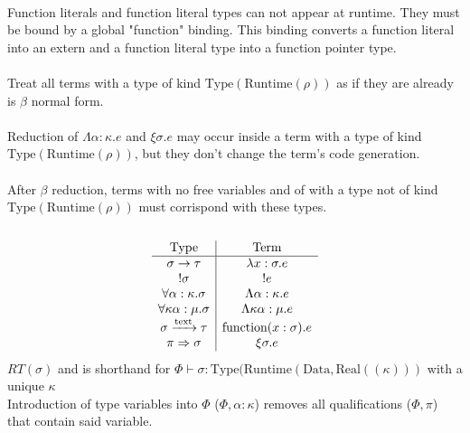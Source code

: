 \documentclass {article}
\begin{document}
\\
Function literals and function literal types can not appear at runtime. They must be bound by a global "function" binding.
This binding converts a function literal into an extern and a function literal type into a function pointer type. \\
\\
Treat all terms with a type of kind $ \text{Type} (\text{Runtime} (\rho)) $ as if they are already is $ \beta $ normal form. \\
\\
Reduction of $ \Lambda \alpha : \kappa. e $ and $ \xi \sigma. e $ may occur inside a term with a type of kind $ \text{Type} (\text{Runtime} (\rho)) $, but they don't
change the term's code generation. \\
\\
After $ \beta $ reduction, terms with no free variables and of with a type not of kind $ \text{Type} (\text{Runtime} (\rho) ) $ must corrispond with these types. \\
\\
\begin{gather*}
\begin{array}{c | c}
\text{Type} & \text{Term} \\
\hline
\sigma \to \tau & \lambda x : \sigma. e \\
!\sigma & !e \\
\forall \alpha : \kappa. \sigma & \Lambda \alpha : \kappa. e  \\
\forall \kappa \alpha : \mu. \sigma & \Lambda \kappa \alpha : \mu. e \\
\sigma \xrightarrow{\text{text}} \tau & \text{function}(x : \sigma). e \\
\pi \Rightarrow \sigma & \xi \sigma. e
\end{array}
\\
\end{gather*}
$ RT (\sigma) $ and is shorthand for $ \Phi \vdash \sigma : \text{Type} (\text{Runtime} (\text{Data}, \text{Real} ((\kappa))) $ with a unique $ \kappa $ \\
Introduction of type variables into $ \Phi $ ($\Phi , \alpha : \kappa $) removes all qualifications ($\Phi , \pi$) that contain said variable. 
\end{document}
